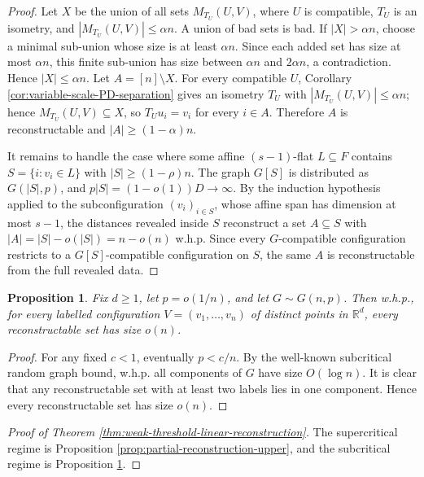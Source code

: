 \documentclass[fullpage,11pt]{article}
\theoremstyle{break}
\newtheorem{proposition}[theorem]{Proposition}
\theoremstyle{definition}
\theoremstyle{break}
\begin{document}
\begin{proof}
Let \(X\) be the union of all sets \(M_{T_U}(U,V)\), where \(U\) is compatible,
\(T_U\) is an isometry, and \(|M_{T_U}(U,V)|\le\alpha n\). A union of bad
sets is bad. If \(|X|>\alpha n\), choose a minimal sub-union whose size is at least
\(\alpha n\). Since each added set has size at most \(\alpha n\),
this finite sub-union has size between \(\alpha n\) and \(2\alpha n\), a
contradiction. Hence \(|X|\le\alpha n\). Let \(A=[n]\setminus X\). For every
compatible \(U\), Corollary \ref{cor:variable-scale-PD-separation} gives an isometry
\(T_U\) with \(|M_{T_U}(U,V)|\le\alpha n\); hence
\(M_{T_U}(U,V)\subseteq X\), so \(T_Uu_i=v_i\) for every \(i\in A\).
Therefore \(A\) is reconstructable and
\(|A|\ge(1-\alpha)n\).

It remains to handle the case where some affine \((s-1)\)-flat \(L\subseteq F\)
contains \(S=\{i:v_i\in L\}\) with \(|S|\ge(1-\rho)n\). The graph \(G[S]\) is
distributed as \(G(|S|,p)\), and \(p|S|=(1-o(1))D\to\infty\). By the induction
hypothesis applied to the subconfiguration \((v_i)_{i\in S}\), whose affine
span has dimension at most \(s-1\), the distances revealed inside \(S\)
reconstruct a set \(A\subseteq S\) with \(|A|=|S|-o(|S|)=n-o(n)\) w.h.p.
Since every \(G\)-compatible configuration restricts to a
\(G[S]\)-compatible configuration on \(S\), the same \(A\) is reconstructable
from the full revealed data.
\end{proof}

\begin{proposition}\label{prop:partial-reconstruction-lower}
Fix \(d\ge1\), let \(p=o(1/n)\), and let \(G\sim G(n,p)\). Then w.h.p., for
every labelled configuration \(V=(v_1,\ldots,v_n)\) of distinct points in
\(\mathbb R^d\), every reconstructable set has size \(o(n)\).
\end{proposition}

\begin{proof}
For any fixed \(c<1\), eventually \(p<c/n\). By the well-known subcritical
random graph bound, w.h.p. all components of \(G\) have size \(O(\log n)\).
It is clear that any reconstructable set with at least two labels lies in one
component. Hence every reconstructable set has size \(o(n)\).
\end{proof}

\begin{proof}[Proof of Theorem \ref{thm:weak-threshold-linear-reconstruction}]
The supercritical regime is Proposition \ref{prop:partial-reconstruction-upper}, and
the subcritical regime is Proposition \ref{prop:partial-reconstruction-lower}.
\end{proof}
\end{document}
